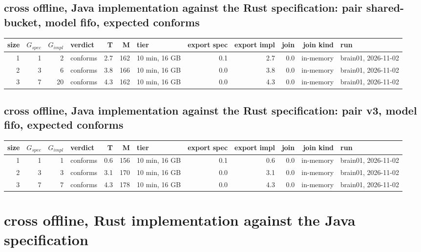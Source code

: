 \documentclass[10pt]{article}
\begin{document}
\subsection*{cross offline, Java implementation against the Rust specification: pair \textsf{shared-bucket}, model fifo, expected conforms}
\begin{longtable}{@{}rrrlrrlrrrrl@{}}
\toprule
size & $G_{\mathit{spec}}$ & $G_{\mathit{impl}}$ & verdict & T & M & tier & export spec & export impl & join & join kind & run \\
\midrule
\endhead
\color{red} 1 & 1 & 2 & conforms & 2.7 & 162 & 10 min, 16 GB & 0.1 & 2.7 & 0.0 & in-memory & brain01, 2026-11-02 \\
\color{red} 2 & 3 & 6 & conforms & 3.8 & 166 & 10 min, 16 GB & 0.0 & 3.8 & 0.0 & in-memory & brain01, 2026-11-02 \\
\color{red} 3 & 7 & 20 & conforms & 4.3 & 162 & 10 min, 16 GB & 0.0 & 4.3 & 0.0 & in-memory & brain01, 2026-11-02 \\
\bottomrule
\end{longtable}
\subsection*{cross offline, Java implementation against the Rust specification: pair \textsf{v3}, model fifo, expected conforms}
\begin{longtable}{@{}rrrlrrlrrrrl@{}}
\toprule
size & $G_{\mathit{spec}}$ & $G_{\mathit{impl}}$ & verdict & T & M & tier & export spec & export impl & join & join kind & run \\
\midrule
\endhead
\color{red} 1 & 1 & 1 & conforms & 0.6 & 156 & 10 min, 16 GB & 0.1 & 0.6 & 0.0 & in-memory & brain01, 2026-11-02 \\
\color{red} 2 & 3 & 3 & conforms & 3.1 & 170 & 10 min, 16 GB & 0.0 & 3.1 & 0.0 & in-memory & brain01, 2026-11-02 \\
\color{red} 3 & 7 & 7 & conforms & 4.3 & 178 & 10 min, 16 GB & 0.0 & 4.3 & 0.0 & in-memory & brain01, 2026-11-02 \\
\bottomrule
\end{longtable}
\section*{cross offline, Rust implementation against the Java specification}
\end{document}
